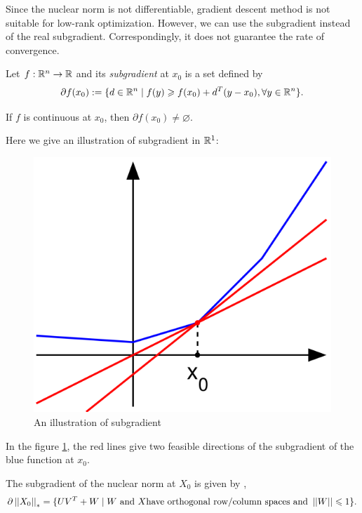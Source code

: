 \documentclass[11pt]{article}
\begin{document}
\begin{problem}
Since the nuclear norm is not differentiable, gradient descent method is not suitable for low-rank optimization. However, we can use the subgradient instead of the real subgradient. Correspondingly, it does not guarantee the rate of convergence.



\begin{definition}
    Let \(f:\mathbb R^n \to \mathbb R\) and its \emph{subgradient} at \(x_0\) is a set defined by
    \[\partial f(x_0) := \{d \in \mathbb R^n \mid f(y)\geqslant f(x_0) + d^T (y-x_0),\forall y \in \mathbb R^n\}.\]
\end{definition}

\begin{remark}
    If \(f\) is continuous at \(x_0\), then \(\partial f(x_0) \neq \varnothing\).
\end{remark}

Here we give an illustration of subgradient in \(\mathbb R^1\):
\begin{figure}[H]
    \centering
    \includegraphics[scale=0.3]{img/Subderivative_illustration.png}
    \setlength{\abovecaptionskip}{0cm}
    \caption{An illustration of subgradient}
    \label{fig:subgradient}
\end{figure}

In the figure \ref{fig:subgradient}, the red lines give two feasible directions of the subgradient of the blue function at \(x_0\).

The subgradient of the nuclear norm at \(X_0\) is given by \cite{lewis2003mathematics},\cite{watson1992characterization}
\[\partial \left|\left|X_0\right|\right|_* = \{UV^T+W \mid W \text{ and } X \text{have orthogonal row/column spaces and } \left|\left|W\right|\right| \leqslant 1 \}.\]


\end{problem}
\end{document}
